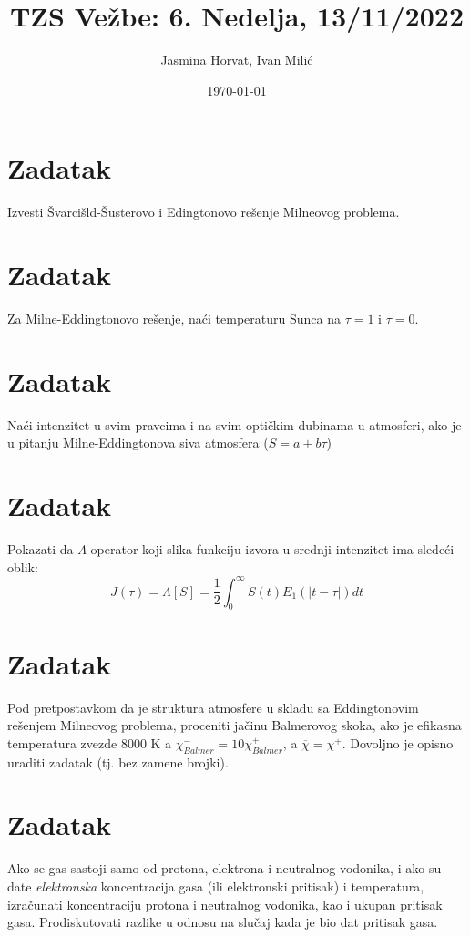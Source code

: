 \documentclass[12pt]{article}
\title{TZS Ve\v{z}be: 6. Nedelja, 13/11/2022}
\author{Jasmina Horvat, Ivan Mili\'{c}}
\date{\today}
\begin{document}
\maketitle

\section{Zadatak}
Izvesti Švarcišld-Šusterovo i Edingtonovo rešenje Milneovog problema. 

\section{Zadatak}
Za Milne-Eddingtonovo rešenje, naći temperaturu Sunca na $\tau=1$ i $\tau=0$. 

\section{Zadatak}
Na\'{c}i intenzitet u svim pravcima i na svim optičkim dubinama u atmosferi, ako je u pitanju Milne-Eddingtonova siva atmosfera ($S=a+b\tau$)

\section{Zadatak}
Pokazati da $\Lambda$ operator koji slika funkciju izvora u srednji intenzitet ima slede\'{c}i oblik:
\begin{equation}
J(\tau) = \Lambda [S] = \frac{1}{2} \int_0^{\infty} S(t) E_1(|t-\tau|) dt 
\end{equation} 

\section{Zadatak}
Pod pretpostavkom da je struktura atmosfere u skladu sa Eddingtonovim re\v{s}enjem Milneovog problema, proceniti ja\v{c}inu Balmerovog skoka, ako je efikasna temperatura zvezde 8000 K a $\chi^-_{Balmer} = 10 \chi^+_{Balmer}$, a $\overline{\chi} = \chi^+$. Dovoljno je opisno uraditi zadatak (tj. bez zamene brojki).

\section{Zadatak}
Ako se gas sastoji samo od protona, elektrona i neutralnog vodonika, i ako su date \emph{elektronska} koncentracija gasa (ili elektronski pritisak) i temperatura, izra\v{c}unati koncentraciju protona i neutralnog vodonika, kao i ukupan pritisak gasa. Prodiskutovati razlike u odnosu na slu\v{c}aj kada je bio dat pritisak gasa. 
\end{document}
